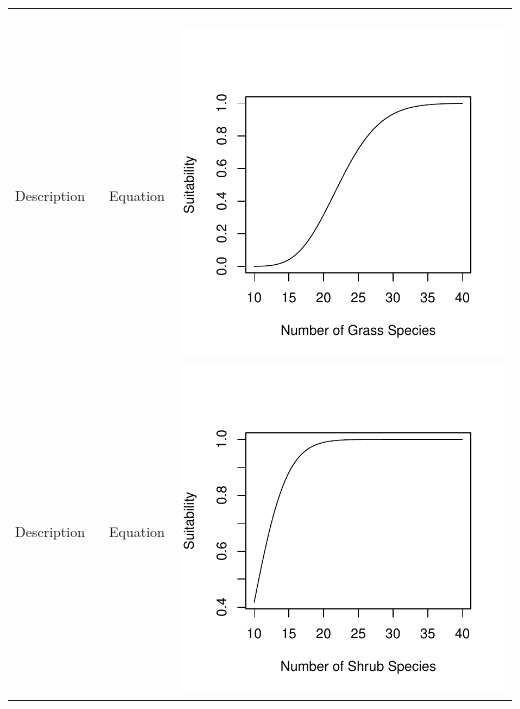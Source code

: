 \documentclass[12pt,letterpaper]{article}\usepackage{graphicx, color}
\makeatletter
\def\maxwidth{ %
  \ifdim\Gin@nat@width>\linewidth
    \linewidth
  \else
    \Gin@nat@width
  \fi
}
\newenvironment{knitrout}{}{} %
\makeatother
\begin{document}
\begin{center}
\begin{tabular}{p{}cc}
\begin{figure}
\end{figure}\\
Description & Equation &
\begin{knitrout}
\definecolor{shadecolor}{rgb}{0.969, 0.969, 0.969}\color{fgcolor}\includegraphics[width=\maxwidth]{figure/Ellis_Grass_diversity} 
\end{knitrout}

\\
Description & Equation &
\begin{knitrout}
\definecolor{shadecolor}{rgb}{0.969, 0.969, 0.969}\color{fgcolor}\includegraphics[width=\maxwidth]{figure/Ellis_Shrub_diversity} 
\end{knitrout}

\end{tabular}\\
\end{center}
\end{document}
